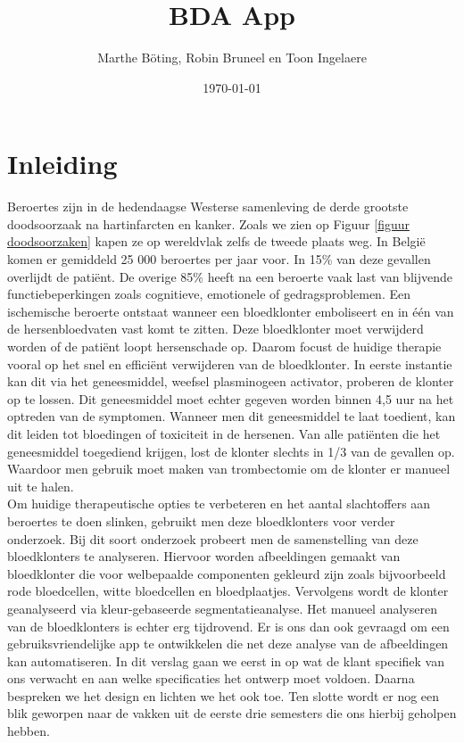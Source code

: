 \documentclass[a4paper,kulak]{kulakarticle}
\date{\today}
\title{BDA App}
\author{Marthe B\"{o}ting,	Robin Bruneel en Toon Ingelaere}
\begin{document}
	
	
	\maketitle

\section*{Inleiding}
Beroertes zijn in de hedendaagse Westerse samenleving de derde grootste doodsoorzaak na hartinfarcten en kanker. Zoals we zien op Figuur \ref{figuur doodsoorzaken} kapen ze op wereldvlak zelfs de tweede plaats weg\cite{worldhealthorganization}. In België komen er gemiddeld 25 000 beroertes per jaar voor. In 15\% van deze gevallen overlijdt de patiënt. De overige 85\% heeft na een beroerte vaak last van blijvende functiebeperkingen zoals cognitieve, emotionele of gedragsproblemen. Een ischemische beroerte ontstaat wanneer een bloedklonter emboliseert en in één van de hersenbloedvaten vast komt te zitten. Deze bloedklonter moet verwijderd worden of de patiënt loopt hersenschade op.
Daarom focust de huidige therapie vooral op het snel en efficiënt verwijderen van de bloedklonter. In eerste instantie kan dit via het geneesmiddel, weefsel plasminogeen activator, proberen de klonter op te lossen. Dit geneesmiddel moet echter gegeven worden binnen 4,5 uur na het optreden van de symptomen. Wanneer men dit geneesmiddel te laat toedient, kan dit leiden tot bloedingen of toxiciteit in de hersenen. Van alle patiënten die het geneesmiddel toegediend krijgen, lost de klonter slechts in 1/3 van de gevallen op. Waardoor men gebruik moet maken van trombectomie om de klonter er manueel uit te halen.\\
Om huidige therapeutische opties te verbeteren en het aantal slachtoffers aan beroertes te doen slinken, gebruikt men deze bloedklonters voor verder onderzoek. Bij dit soort onderzoek probeert men de samenstelling van deze bloedklonters te analyseren. Hiervoor worden afbeeldingen gemaakt van bloedklonter die voor welbepaalde componenten gekleurd zijn zoals bijvoorbeeld rode bloedcellen, witte bloedcellen en bloedplaatjes. Vervolgens wordt de klonter geanalyseerd via kleur-gebaseerde segmentatieanalyse. 
Het manueel analyseren van de bloedklonters is echter erg tijdrovend. Er is ons dan ook gevraagd om een gebruiksvriendelijke app te ontwikkelen die net deze analyse van de afbeeldingen kan automatiseren.
In dit verslag gaan we eerst in op wat de klant specifiek van ons verwacht en aan welke specificaties het ontwerp moet voldoen. Daarna bespreken we het design en lichten we het ook toe. Ten slotte wordt er nog een blik geworpen naar de vakken uit de eerste drie semesters die ons hierbij geholpen hebben.
\end{document}
